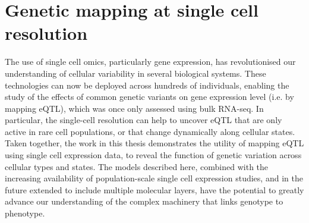 \section{Genetic mapping at single cell resolution}

The use of single cell omics, particularly gene expression, has revolutionised our understanding of cellular variability in several biological systems.
These technologies can now be deployed across hundreds of individuals, enabling the study of the effects of common genetic variants on gene expression level (i.e. by mapping eQTL), which was once only assessed using bulk RNA-seq.
In particular, the single-cell resolution can help to uncover eQTL that are only active in rare cell populations, or that change dynamically along cellular states. 
Taken together, the work in this thesis demonstrates the utility of mapping eQTL using single cell expression data, to reveal the function of genetic variation across cellular types and states.
The models described here, combined with the increasing availability of population-scale single cell expression studies, and in the future extended to include multiple molecular layers, have the potential to greatly advance our understanding of the complex machinery that links genotype to phenotype. \\